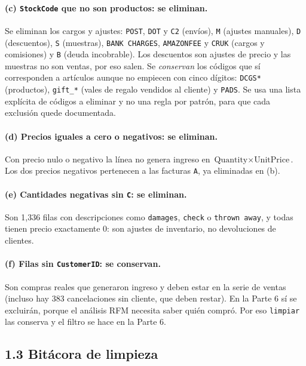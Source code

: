 \documentclass[11pt]{article}
\begin{document}
\paragraph{(c) \texttt{StockCode} que no son productos: se eliminan.} Se
eliminan los cargos y ajustes: \texttt{POST}, \texttt{DOT} y \texttt{C2}
(env\'ios), \texttt{M} (ajustes manuales), \texttt{D} (descuentos), \texttt{S}
(muestras), \texttt{BANK CHARGES}, \texttt{AMAZONFEE} y \texttt{CRUK} (cargos
y comisiones) y \texttt{B} (deuda incobrable). Los descuentos son ajustes de
precio y las muestras no son ventas, por eso salen. Se \emph{conservan} los
c\'odigos que s\'i corresponden a art\'iculos aunque no empiecen con cinco
d\'igitos: \texttt{DCGS*} (productos), \texttt{gift\_*} (vales de regalo
vendidos al cliente) y \texttt{PADS}. Se usa una lista expl\'icita de c\'odigos
a eliminar y no una regla por patr\'on, para que cada exclusi\'on quede
documentada.

\paragraph{(d) Precios iguales a cero o negativos: se eliminan.} Con precio
nulo o negativo la l\'inea no genera ingreso en $\text{Quantity}\times
\text{UnitPrice}$. Los dos precios negativos pertenecen a las facturas
\texttt{A}, ya eliminadas en (b).

\paragraph{(e) Cantidades negativas sin \texttt{C}: se eliminan.} Son 1{,}336
filas con descripciones como \texttt{damages}, \texttt{check} o
\texttt{thrown away}, y todas tienen precio exactamente 0: son ajustes de
inventario, no devoluciones de clientes.

\paragraph{(f) Filas sin \texttt{CustomerID}: se conservan.} Son compras
reales que generaron ingreso y deben estar en la serie de ventas (incluso hay
383 cancelaciones sin cliente, que deben restar). En la Parte 6 s\'i se
excluir\'an, porque el an\'alisis RFM necesita saber qui\'en compr\'o. Por eso
\texttt{limpiar} las conserva y el filtro se hace en la Parte 6.

\subsection*{1.3 Bit\'acora de limpieza}
\end{document}
